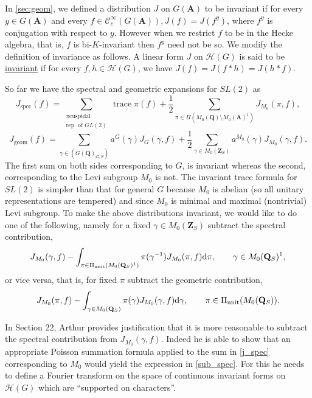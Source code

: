 \documentclass[11pt]{amsart}
\def\A{\mathbf A}
\def\Q{\mathbf Q}
\def\Z{\mathbf Z}
\def\CCC{\mathcal C}
\def\HHH{\mathcal H}
\def\d{\text d}
\def\bs{\setminus}
\def\trace{\operatorname{trace}}
\theoremstyle{remark}
\begin{document}
In \cref{sec:geom}, we defined a distribution $J$ on $G(\A)$ to be invariant if for every $y \in G(\A)$ and every $f \in \CCC_c^\infty(G(\A)), J(f) = J(f^y)$, where $f^y$ is conjugation with respect to $y$. However when we restrict $f$ to be in the Hecke algebra, that is, $f$ is bi-$K$-invariant then $f^y$ need not be so. We modify the definition of invariance as follows. A linear form $J$ on $\HHH(G)$ is said to be \underline{invariant} if for every $f, h \in \HHH(G)$, we have $J(f) = J(f*h) = J(h*f)$.

So far we have the spectral and geometric expansions for $SL(2)$ as
\begin{equation} \label{j_spec}
	J_{\text{spec}}(f) = \sum_{\substack{\pi \text{cuspidal} \\ \text{rep. of } GL(2)}} \trace \pi(f) + \frac{1}{2} \sum_{\pi \in \Pi(M_0(\Q) \bs M_0(\A)^1)} J_{M_0}(\pi, f), 
\end{equation}
\begin{equation} \label{j_geom}
	J_{\text{geom}}(f) = \sum_{\gamma \in (G(\Q)_{G, S})} a^G(\gamma) J_G(\gamma, f) + \frac{1}{2} \sum_{\gamma \in M_0(\Z_S)} a^{M_0}(\gamma) J_{M_0}(\gamma, f). 
\end{equation}
The first sum on both sides corresponding to $G$, is invariant whereas the second, corresponding to the Levi subgroup $M_0$ is not. The invariant trace formula for $SL(2)$ is simpler than that for general $G$ because $M_0$ is abelian (so all unitary representations are tempered) and since $M_0$ is minimal and maximal (nontrivial) Levi subgroup. To make the above distributions invariant, we would like to do one of the following, namely for a fixed $\gamma \in M_0(\Z_S)$ subtract the spectral contribution, 
\begin{equation} \label{sub_spec}
J_{M_0}(\gamma, f) - \int_{\pi \in \Pi_{\text{unit}}(M_0(\Q_S)^1)} \pi(\gamma^{-1}) J_{M_0}(\pi, f) \d \pi, \qquad \gamma \in M_0(\Q_S)^1,
\end{equation}
or vice versa, that is, for fixed $\pi$ subtract the geometric contribution,
\[ J_{M_0}(\pi, f) - \int_{\gamma \in M_0(\Q_S)} \pi(\gamma) J_{M_0}(\gamma, f) \d \gamma, \qquad \pi \in \Pi_{\text{unit}}(M_0(\Q_S)). \]

In Section 22, Arthur provides justification that it is more reasonable to subtract the spectral contribution from $J_{M_0}(\gamma, f)$. Indeed he is able to show that an appropriate Poisson summation formula applied to the sum in \cref{j_spec} corresponding to $M_0$ would yield the expression in \cref{sub_spec}. For this he needs to define a Fourier transform on the space of continuous invariant forms on $\HHH(G)$ which are ``supported on characters''. 
\end{document}
